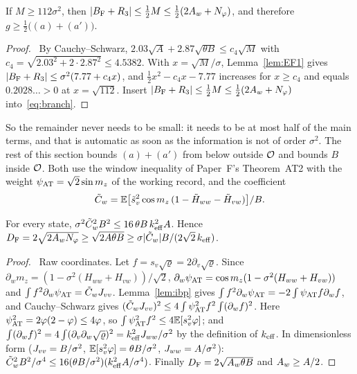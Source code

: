 \begin{lemma}[Threshold]\label{lem:EF2}
If $M\ge112\sigma^2$, then $|B_{\mathrm F}+R_3|\le\frac12M\le\frac12(2A_w+N_\varphi)$, and therefore $g\ge\frac12\big((a)+(a')\big)$.
\end{lemma}
\begin{proof}\proofst\
By Cauchy--Schwarz, $2.03\sqrt A+2.87\sqrt{\theta B}\le c_4\sqrt M$ with $c_4=\sqrt{2.03^2+2\cdot2.87^2}\le4.5382$.
With $x=\sqrt M/\sigma$, Lemma~\ref{lem:EF1} gives $|B_{\mathrm F}+R_3|\le\sigma^2(7.77+c_4x)$, and $\frac12x^2-c_4x-7.77$ increases for $x\ge c_4$ and equals $0.2028\ldots>0$ at $x=\sqrt{112}$.
Insert $|B_{\mathrm F}+R_3|\le\frac12M\le\frac12(2A_w+N_\varphi)$ into~\eqref{eq:branch}.
\end{proof}

So the remainder never needs to be small: it needs to be at most half of the main terms, and that is automatic as soon as the information is not of order $\sigma^2$.
The rest of this section bounds $(a)+(a')$ from below outside $\mathcal O$ and bounds $B$ inside $\mathcal O$.
Both use the window inequality of Paper~F's Theorem~AT2 with the weight $\psi_{\rm AT}=\sqrt2\sin m_z$ of the working record, and the coefficient
\begin{equation}
\tilde C_w=\mathbb{E}\big[\tilde s_v^2\cos m_z\,(1-\tilde H_{ww}-\tilde H_{vw})\big]/B .
\end{equation}

\begin{lemma}\label{lem:window}
For every state, $\sigma^2\tilde C_w^2B^2\le16\,\theta B\,k_{\mathrm{eff}}^2A$. Hence $D_{\rm F}=2\sqrt{2A_wN_\varphi}\ge\sqrt{2A\theta B}\ge\sigma|\tilde C_w|B/(2\sqrt2\,k_{\mathrm{eff}})$.
\end{lemma}
\begin{proof}\proofst\
Raw coordinates. Let $f=s_v\sqrt\varrho=2\partial_v\sqrt\varrho$.
Since $\partial_wm_z=(1-\sigma^2(H_{ww}+H_{vw}))/\sqrt2$, $\partial_w\psi_{\rm AT}=\cos m_z(1-\sigma^2(H_{ww}+H_{vw}))$ and $\int f^2\partial_w\psi_{\rm AT}=\tilde C_wJ_{vv}$.
Lemma~\ref{lem:ibp} gives $\int f^2\partial_w\psi_{\rm AT}=-2\int\psi_{\rm AT}f\partial_wf$, and Cauchy--Schwarz gives $(\tilde C_wJ_{vv})^2\le4\int\psi_{\rm AT}^2f^2\int(\partial_wf)^2$.
Here $\psi_{\rm AT}^2=2\varphi(2-\varphi)\le4\varphi$, so $\int\psi_{\rm AT}^2f^2\le4\mathbb{E}[s_v^2\varphi]$; and $\int(\partial_wf)^2=4\int(\partial_v\partial_w\sqrt\varrho)^2=k_{\mathrm{eff}}^2J_{ww}/\sigma^2$ by the definition of $k_{\mathrm{eff}}$.
In dimensionless form ($J_{vv}=B/\sigma^2$, $\mathbb{E}[s_v^2\varphi]=\theta B/\sigma^2$, $J_{ww}=A/\sigma^2$): $\tilde C_w^2B^2/\sigma^4\le16(\theta B/\sigma^2)(k_{\mathrm{eff}}^2A/\sigma^4)$.
Finally $D_{\rm F}=2\sqrt{A_w\theta B}$ and $A_w\ge A/2$.
\end{proof}

